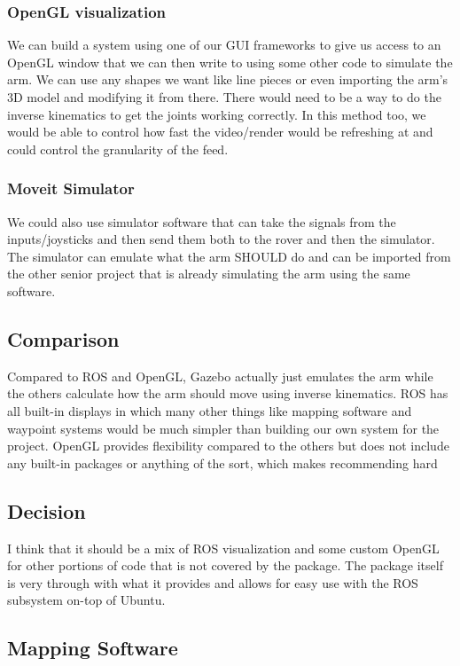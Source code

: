 \documentclass[onecolumn, draftclsnofoot, 10pt, compsoc]{IEEEtran}
\begin{document}
\subsubsection{OpenGL visualization}
We can build a system using one of our GUI frameworks to give us access to an OpenGL window that we can then write to using some other code to simulate the arm. 
We can use any shapes we want like line pieces or even importing the arm's 3D model and modifying it from there. 
There would need to be a way to do the inverse kinematics to get the joints working correctly.
In this method too, we would be able to control how fast the video/render would be refreshing at and could control the granularity of the feed.

\subsubsection{Moveit Simulator}
We could also use simulator software that can take the signals from the inputs/joysticks and then send them both to the rover and then the simulator.
The simulator can emulate what the arm SHOULD do and can be imported from the other senior project that is already simulating the arm using the same software.

\subsection{Comparison}
Compared to ROS and OpenGL, Gazebo actually just emulates the arm while the others calculate how the arm should move using inverse kinematics.
ROS has all built-in displays in which many other things like mapping software and waypoint systems would be much simpler than building our own system for the project.
OpenGL provides flexibility compared to the others but does not include any built-in packages or anything of the sort, which makes recommending hard 
\subsection*{Decision}
I think that it should be a mix of ROS visualization and some custom OpenGL for other portions of code that is not covered by the package.
The package itself is very through with what it provides and allows for easy use with the ROS subsystem on-top of Ubuntu.

\subsection{Mapping Software}
\end{document}
